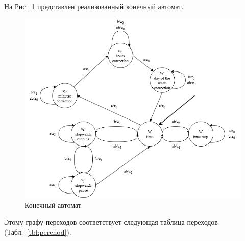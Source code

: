 \documentclass[a4paper, final]{article}
\begin{document}
\newpage
На Рис.~\ref{img:automaton} представлен реализованный конечный автомат.

\begin{figure}[H]
   \centering
   \includegraphics[width=\linewidth]{automaton.png}
   \caption{Конечный автомат}
   \label{img:automaton}
\end{figure}

Этому графу переходов соответствует следующая таблица переходов (Табл.~\ref{tbl:perehod}).
\end{document}
